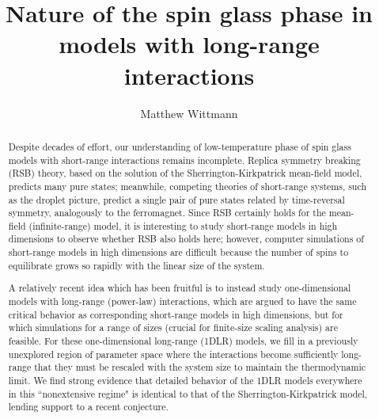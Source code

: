 \documentclass[phd]{ucbthesis}
\begin{document}
\title{Nature of the spin glass phase in models with long-range interactions}
\author{Matthew Wittmann}

\maketitle
\approvalpage
\copyrightpage

\begin{abstract}
  Despite decades of effort, our understanding of low-temperature phase of spin
  glass models with short-range interactions remains incomplete. Replica
  symmetry breaking (RSB) theory, based on the solution of the
  Sherrington-Kirkpatrick mean-field model, predicts many pure states;
  meanwhile, competing theories of short-range systems, such as the droplet
  picture, predict a single pair of pure states related by time-reversal
  symmetry, analogously to the ferromagnet. Since RSB certainly holds for the
  mean-field (infinite-range) model, it is interesting to study short-range
  models in high dimensions to observe whether RSB also holds here; however,
  computer simulations of short-range models in high dimensions are difficult
  because the number of spins to equilibrate grows so rapidly with the linear
  size of the system.

  A relatively recent idea which has been fruitful is to instead study
  one-dimensional models with long-range (power-law) interactions, which are
  argued to have the same critical behavior as corresponding short-range models
  in high dimensions, but for which simulations for a range of sizes (crucial
  for finite-size scaling analysis) are feasible. For these one-dimensional
  long-range (1DLR) models, we fill in a previously unexplored region of
  parameter space where the interactions become sufficiently long-range that
  they must be rescaled with the system size to maintain the thermodynamic
  limit. We find strong evidence that detailed behavior of the 1DLR models
  everywhere in this ``nonextensive regime" is identical to that of the
  Sherrington-Kirkpatrick model, lending support to a recent conjecture.


\end{abstract}
\end{document}
